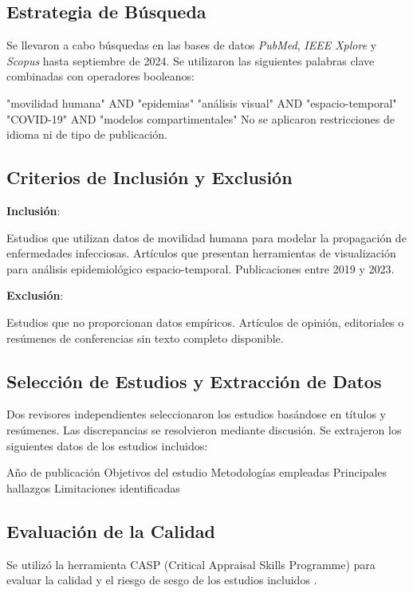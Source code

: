 \documentclass[sigconf]{acmart}
\begin{document}
\subsection{Estrategia de Búsqueda}

Se llevaron a cabo búsquedas en las bases de datos \textit{PubMed}, \textit{IEEE Xplore} y \textit{Scopus} hasta septiembre de 2024. Se utilizaron las siguientes palabras clave combinadas con operadores booleanos:

"movilidad humana" AND "epidemias"
"análisis visual" AND "espacio-temporal"
"COVID-19" AND "modelos compartimentales"
No se aplicaron restricciones de idioma ni de tipo de publicación.

\subsection{Criterios de Inclusión y Exclusión}

\textbf{Inclusión}:

Estudios que utilizan datos de movilidad humana para modelar la propagación de enfermedades infecciosas.
Artículos que presentan herramientas de visualización para análisis epidemiológico espacio-temporal.
Publicaciones entre 2019 y 2023.

\textbf{Exclusión}:

Estudios que no proporcionan datos empíricos.
Artículos de opinión, editoriales o resúmenes de conferencias sin texto completo disponible.

\subsection{Selección de Estudios y Extracción de Datos}

Dos revisores independientes seleccionaron los estudios basándose en títulos y resúmenes. Las discrepancias se resolvieron mediante discusión. Se extrajeron los siguientes datos de los estudios incluidos:

Año de publicación
Objetivos del estudio
Metodologías empleadas
Principales hallazgos
Limitaciones identificadas
\subsection{Evaluación de la Calidad}

Se utilizó la herramienta CASP (Critical Appraisal Skills Programme) para evaluar la calidad y el riesgo de sesgo de los estudios incluidos \cite{casp2018}.
\end{document}
